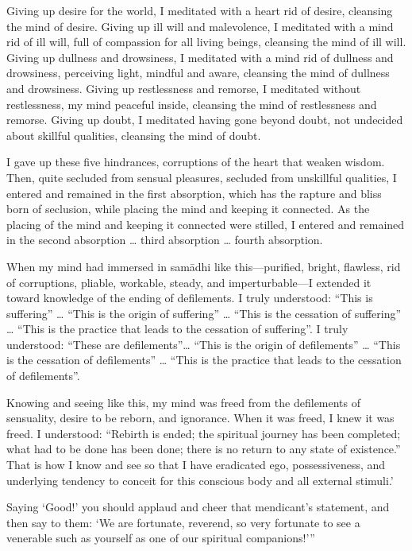 \documentclass[12pt,openany]{book}%
\begin{document}
Giving up desire for the world, I meditated with a heart rid of desire, cleansing the mind of desire. Giving up ill will and malevolence, I meditated with a mind rid of ill will, full of compassion for all living beings, cleansing the mind of ill will. Giving up dullness and drowsiness, I meditated with a mind rid of dullness and drowsiness, perceiving light, mindful and aware, cleansing the mind of dullness and drowsiness. Giving up restlessness and remorse, I meditated without restlessness, my mind peaceful inside, cleansing the mind of restlessness and remorse. Giving up doubt, I meditated having gone beyond doubt, not undecided about skillful qualities, cleansing the mind of doubt. 

I gave up these five hindrances, corruptions of the heart that weaken wisdom. Then, quite secluded from sensual pleasures, secluded from unskillful qualities, I entered and remained in the first absorption, which has the rapture and bliss born of seclusion, while placing the mind and keeping it connected. As the placing of the mind and keeping it connected were stilled, I entered and remained in the second absorption … third absorption … fourth absorption. 

When my mind had immersed in \textsanskrit{samādhi} like this—purified, bright, flawless, rid of corruptions, pliable, workable, steady, and imperturbable—I extended it toward knowledge of the ending of defilements. I truly understood: “This is suffering” … “This is the origin of suffering” … “This is the cessation of suffering” … “This is the practice that leads to the cessation of suffering”. I truly understood: “These are defilements”… “This is the origin of defilements” … “This is the cessation of defilements” … “This is the practice that leads to the cessation of defilements”. 

Knowing and seeing like this, my mind was freed from the defilements of sensuality, desire to be reborn, and ignorance. When it was freed, I knew it was freed. I understood: “Rebirth is ended; the spiritual journey has been completed; what had to be done has been done; there is no return to any state of existence.” That is how I know and see so that I have eradicated ego, possessiveness, and underlying tendency to conceit for this conscious body and all external stimuli.’ 

Saying ‘Good!’ you should applaud and cheer that mendicant’s statement, and then say to them: ‘We are fortunate, reverend, so very fortunate to see a venerable such as yourself as one of our spiritual companions!’” 
\end{document}
